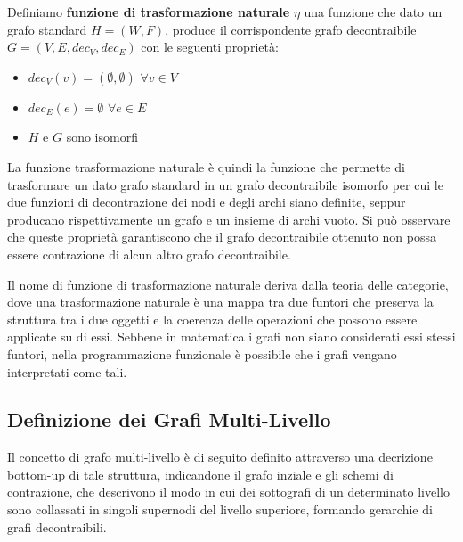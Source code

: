    \begin{definition} 
    Definiamo \textbf{funzione di trasformazione naturale} $\eta$ una funzione che dato un grafo standard
        $H=(W,F)$, produce il corrispondente grafo decontraibile $G = (V, E, dec_V, dec_E)$ con le seguenti propriet\`a:
        \begin{itemize}
            \item $dec_V(v) = (\emptyset, \emptyset)$ \quad $\forall v\in V$
            \item $dec_E(e) = \emptyset$ \quad $\forall e\in E$
            \item $H$ e $G$ sono isomorfi
        \end{itemize}
    \end{definition}

    La funzione trasformazione naturale \`e quindi la funzione che permette di trasformare un dato grafo standard in un
    grafo decontraibile isomorfo per cui le due funzioni di decontrazione dei nodi e degli archi siano definite,
    seppur producano rispettivamente un grafo e un insieme di archi vuoto. \newline
    Si pu\`o osservare che queste propriet\`a garantiscono che il grafo decontraibile ottenuto non possa essere
    contrazione di alcun altro grafo decontraibile. \newline

    Il nome di funzione di trasformazione naturale deriva dalla teoria delle categorie, dove una trasformazione
    naturale \`e una mappa tra due funtori che preserva la struttura tra i due oggetti e la coerenza delle operazioni
    che possono essere applicate su di essi. Sebbene in matematica i grafi non siano considerati essi stessi funtori,
    nella programmazione funzionale \`e possibile che i grafi vengano interpretati come tali. \newline

    \subsection{Definizione dei Grafi Multi-Livello}\label{subsec:definzione-grafi_multilivello}

    Il concetto di grafo multi-livello \`e di seguito definito attraverso una decrizione bottom-up di tale struttura,
    indicandone il grafo inziale e gli schemi di contrazione, che descrivono il modo in cui dei sottografi di un
    determinato livello sono collassati in singoli supernodi del livello superiore, formando gerarchie di grafi
    decontraibili.

